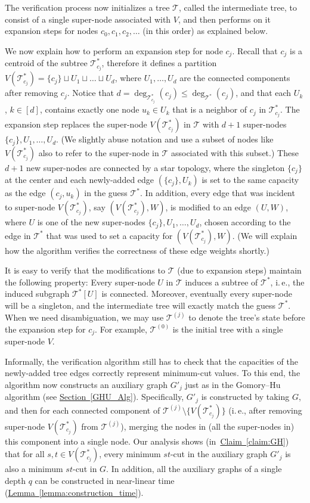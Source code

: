 \documentclass[11pt]{article}
\numberwithin{equation}{section}
\theoremstyle{definition}
\theoremstyle{plain}
\newcommand{\ie}{i.\,e.}
\newcommand{\expref}[2]{\hyperref[#2]{#1~\ref{#2}}}
\theoremstyle{plain}
\newcommand{\T}{\mathcal{T}}
\newcommand{\TG}{\mathcal{T}^*}
\providecommand{\set}[1]{{\{#1\}}}
\begin{document}
The verification process now initializes a tree $\T$,
called the intermediate tree,
to consist of a single super-node associated with $V$,
and then performs on it expansion steps for nodes $c_0,c_1,c_2,\ldots$
(in this order) as explained below.

We now explain how to perform an expansion step for node $c_j$.
Recall that $c_j$ is a centroid of the subtree $\TG_{c_j}$,
therefore it defines a partition
$V(\TG_{c_j}) = \set{c_j}\sqcup U_1 \sqcup\dots\sqcup U_d$,
where $U_1,\ldots,U_d$ are the connected components after removing $c_j$.
Notice that $d = \deg_{\TG_{c_j}}(c_j)\leq \deg_{\TG}(c_j)$,
and that each $U_k$, $k\in [d]$, contains exactly one node $u_k\in U_k$
that is a neighbor of $c_j$ in $\TG_{c_j}$.
The expansion step replaces the super-node $V(\TG_{c_j})$ in $\T$
with $d+1$ super-nodes $\set{c_j},U_1,\dots,U_d$.
(We slightly abuse notation and use a subset of nodes like $V(\TG_{c_j})$
also to refer to the super-node in $\T$ associated with this subset.)
%
These $d+1$ new super-nodes are connected by a star topology,
where the singleton $\set{c_j}$ at the center
and each newly-added edge $(\set{c_j}, U_k)$
is set to the same capacity as the edge $(c_j, u_k)$ in the guess $\TG$.
In addition, every edge that was incident to super-node $V(\TG_{c_j})$,
say $(V(\TG_{c_j}),W)$, is modified to an edge $(U,W)$,
where $U$ is one of the new super-nodes $\set{c_j},U_1,\dots,U_d$,
chosen according to the edge in $\TG$ that was used to set
a capacity for $(V(\TG_{c_j}),W)$.
(We will explain how the algorithm verifies the correctness of these edge weights shortly.)

It is easy to verify that the modifications to $\T$ (due to expansion steps)
maintain the following property:
Every super-node $U$ in $\T$ induces a subtree of $\TG$,
\ie, the induced subgraph $\TG[U]$ is connected.
Moreover, eventually every super-node will be a singleton,
and the intermediate tree will exactly match the guess $\TG$.
When we need disambiguation, we may use $\T^{(j)}$
to denote the tree's state before the expansion step for $c_j$.
For example, $\T^{(0)}$ is the initial tree with a single super-node $V$.


Informally, the verification algorithm still has to check that the capacities
of the newly-added tree edges correctly represent minimum-cut values.
To this end, the algorithm now constructs an auxiliary graph $G'_j$
just as in the Gomory--Hu algorithm (see \expref{Section}{GHU_Alg}).
Specifically, $G'_j$ is constructed by taking $G$,
and then for each connected component of $\T^{(j)}\setminus \set{V(\TG_{c_j})}$
(\ie, after removing super-node $V(\TG_{c_j})$ from $\T^{(j)}$),
merging the nodes in (all the super-nodes in) this component into a single node.
%
Our analysis shows (in~\expref{Claim}{claim:GH})
that for all $s,t\in V(\TG_{c_j})$,
every minimum $st$-cut in the auxiliary graph $G'_j$
is also a minimum $st$-cut in $G$.
In addition, all the auxiliary graphs of a single depth $q$
can be constructed in near-linear time (\expref{Lemma}{lemma:construction_time}).
\end{document}
